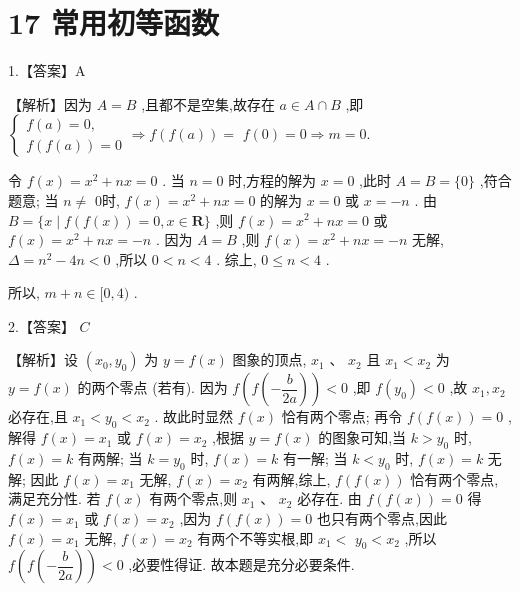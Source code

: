 \documentclass[10pt]{article}
\begin{document}
\section*{17 常用初等函数}

1.【答案】A

【解析】因为 $A = B$ ,且都不是空集,故存在 $a \in  A \cap  B$ ,即 $\left\{  {\begin{array}{l} f\left( a\right)  = 0, \\  f\left( {f\left( a\right) }\right)  = 0 \end{array} \Rightarrow  f\left( {f\left( a\right) }\right)  = }\right.$  $f\left( 0\right)  = 0 \Rightarrow  m = 0.$

令 $f\left( x\right)  = {x}^{2} + {nx} = 0$ . 当 $n = 0$ 时,方程的解为 $x = 0$ ,此时 $A = B = \{ 0\}$ ,符合题意; 当 $n \neq$ 0时, $f\left( x\right)  = {x}^{2} + {nx} = 0$ 的解为 $x = 0$ 或 $x =  - n$ . 由 $B = \{ x \mid  f\left( {f\left( x\right) }\right)  = 0,x \in  \mathbf{R}\}$ ,则 $f\left( x\right)  = {x}^{2} + {nx} = 0$ 或 $f\left( x\right)  = {x}^{2} + {nx} =  - n$ . 因为 $A = B$ ,则 $f\left( x\right)  = {x}^{2} + {nx} =  - n$ 无解, $\Delta  = {n}^{2} - {4n} < 0$ ,所以 $0 < n < 4$ . 综上, $0 \leq  n < 4$ .

所以, $m + n \in  \lbrack 0,4)$ .

2.【答案】 ${C}$

【解析】设 $\left( {{x}_{0},{y}_{0}}\right)$ 为 $y = f\left( x\right)$ 图象的顶点, ${x}_{1}\text{ 、 }{x}_{2}$ 且 ${x}_{1} < {x}_{2}$ 为 $y = f\left( x\right)$ 的两个零点 (若有). 因为 $f\left( {f\left( {-\dfrac{b}{2a}}\right) }\right)  < 0$ ,即 $f\left( {y}_{0}\right)  < 0$ ,故 ${x}_{1},{x}_{2}$ 必存在,且 ${x}_{1} < {y}_{0} < {x}_{2}$ . 故此时显然 $f\left( x\right)$ 恰有两个零点; 再令 $f\left( {f\left( x\right) }\right)  = 0$ ,解得 $f\left( x\right)  = {x}_{1}$ 或 $f\left( x\right)  = {x}_{2}$ ,根据 $y = f\left( x\right)$ 的图象可知,当 $k > {y}_{0}$ 时, $f\left( x\right)  = k$ 有两解; 当 $k = {y}_{0}$ 时, $f\left( x\right)  = k$ 有一解; 当 $k < {y}_{0}$ 时, $f\left( x\right)  = k$ 无解; 因此 $f\left( x\right)  = {x}_{1}$ 无解, $f\left( x\right)  = {x}_{2}$ 有两解,综上, $f\left( {f\left( x\right) }\right)$ 恰有两个零点,满足充分性. 若 $f\left( x\right)$ 有两个零点,则 ${x}_{1}\text{ 、 }{x}_{2}$ 必存在. 由 $f\left( {f\left( x\right) }\right)  = 0$ 得 $f\left( x\right)  = {x}_{1}$ 或 $f\left( x\right)  = {x}_{2}$ ,因为 $f\left( {f\left( x\right) }\right)  = 0$ 也只有两个零点,因此 $f\left( x\right)  = {x}_{1}$ 无解, $f\left( x\right)  = {x}_{2}$ 有两个不等实根,即 ${x}_{1} <$  ${y}_{0} < {x}_{2}$ ,所以 $f\left( {f\left( {-\dfrac{b}{2a}}\right) }\right)  < 0$ ,必要性得证. 故本题是充分必要条件.
\end{document}
